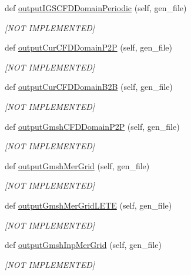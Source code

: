 \begin{DoxyCompactItemize}
def \hyperlink{a00073_a3093ea91273711f4b82aa878c0204407}{output\+I\+G\+S\+C\+F\+D\+Domain\+Periodic} (self, gen\+\_\+file)
\begin{DoxyCompactList}\small\item\em \mbox{[}N\+OT I\+M\+P\+L\+E\+M\+E\+N\+T\+ED\mbox{]} \end{DoxyCompactList}\item 
def \hyperlink{a00073_a3b5fc7f417d1912f563df69560f57c2e}{output\+Cur\+C\+F\+D\+Domain\+P2P} (self, gen\+\_\+file)
\begin{DoxyCompactList}\small\item\em \mbox{[}N\+OT I\+M\+P\+L\+E\+M\+E\+N\+T\+ED\mbox{]} \end{DoxyCompactList}\item 
def \hyperlink{a00073_a925f588daf72fce3ec4e0b89839c290d}{output\+Cur\+C\+F\+D\+Domain\+B2B} (self, gen\+\_\+file)
\begin{DoxyCompactList}\small\item\em \mbox{[}N\+OT I\+M\+P\+L\+E\+M\+E\+N\+T\+ED\mbox{]} \end{DoxyCompactList}\item 
def \hyperlink{a00073_a998cb328088bc95e267cffed35c231ce}{output\+Gmsh\+C\+F\+D\+Domain\+P2P} (self, gen\+\_\+file)
\begin{DoxyCompactList}\small\item\em \mbox{[}N\+OT I\+M\+P\+L\+E\+M\+E\+N\+T\+ED\mbox{]} \end{DoxyCompactList}\item 
def \hyperlink{a00073_a0044216044b48baae08e478a2f358c39}{output\+Gmsh\+Mer\+Grid} (self, gen\+\_\+file)
\begin{DoxyCompactList}\small\item\em \mbox{[}N\+OT I\+M\+P\+L\+E\+M\+E\+N\+T\+ED\mbox{]} \end{DoxyCompactList}\item 
def \hyperlink{a00073_a36211b3ff2243e25921e48d71b9dcf7c}{output\+Gmsh\+Mer\+Grid\+L\+E\+TE} (self, gen\+\_\+file)
\begin{DoxyCompactList}\small\item\em \mbox{[}N\+OT I\+M\+P\+L\+E\+M\+E\+N\+T\+ED\mbox{]} \end{DoxyCompactList}\item 
def \hyperlink{a00073_a258f943645c60945cbb97494db0ebf52}{output\+Gmsh\+Inp\+Mer\+Grid} (self, gen\+\_\+file)
\begin{DoxyCompactList}\small\item\em \mbox{[}N\+OT I\+M\+P\+L\+E\+M\+E\+N\+T\+ED\mbox{]} \end{DoxyCompactList}\item 

\end{DoxyCompactItemize}
